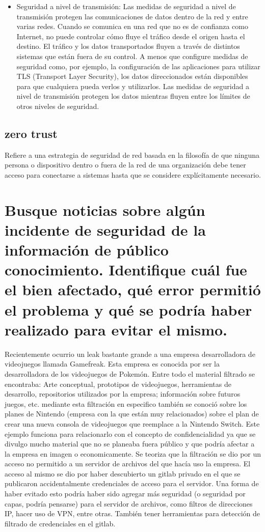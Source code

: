 \documentclass{article}
\begin{document}
\begin{itemize}
				\item Seguridad a nivel de transmisión: Las medidas de seguridad a nivel de transmisión protegen las comunicaciones de datos dentro de la red y entre varias redes. Cuando se comunica en una red que no es de confianza como Internet, no puede controlar cómo fluye el tráfico desde el origen hasta el destino. El tráfico y los datos transportados fluyen a través de distintos sistemas que están fuera de su control. A menos que configure medidas de seguridad como, por ejemplo, la configuración de las aplicaciones para utilizar TLS (Transport Layer Security), los datos direccionados están disponibles para que cualquiera pueda verlos y utilizarlos. Las medidas de seguridad a nivel de transmisión protegen los datos mientras fluyen entre los límites de otros niveles de seguridad.
				
			\end{itemize}
		\subsection{zero trust}
			Refiere a una estrategia de seguridad de red basada en la filosofía de que ninguna persona o dispositivo dentro o fuera de la red de una organización debe tener acceso para conectarse a sistemas hasta que se considere explícitamente necesario. 
	\section{Busque noticias sobre algún incidente de seguridad de la información de público conocimiento. Identifique cuál fue el bien afectado, qué error permitió el problema y qué se podría haber realizado para evitar el mismo.}
		Recientemente ocurrio un leak bastante grande a una empresa desarrolladora de videojuegos llamada Gamefreak.
		Esta empresa es conocida por ser la desarrolladora de los videojuegos de Pokemón. Entre todo el material filtrado se encontraba: Arte conceptual, prototipos de videojuegos, herramientas de desarrollo, repositorios utilizados por la empresa; información sobre futuros juegos, etc. mediante esta filtración en especifico también se conoció sobre los planes de Nintendo (empresa con la que están muy relacionados) sobre el plan de crear una nueva consola de videojuegos que reemplace a la Nintendo Switch.
		Este ejemplo funciona para relacionarlo con el concepto de confidencialidad ya que se divulgo mucho material que no se planeaba fuera público y que podría afectar a la empresa en imagen o economicamente.
		Se teoriza que la filtración se dio por un acceso no permitido a un servidor de archivos del que hacía uso la empresa. El acceso al mismo se dio por haber descubierto un gitlab privado en el que se publicaron accidentalmente credenciales de acceso para el servidor.
		Una forma de haber evitado esto podría haber sido agregar más seguridad (o seguridad por capas, podría pensarse) para el servidor de archivos, como filtros de direcciones IP, hacer uso de VPN, entre otras. 
		También tener herramientas para detección de filtrado de credenciales en el gitlab.
	
\end{document}

